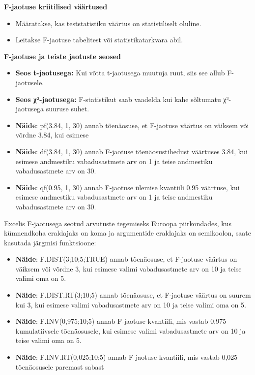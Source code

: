 \documentclass[
]{book}
\providecommand{\tightlist}{%
  \setlength{\itemsep}{0pt}\setlength{\parskip}{0pt}}
\begin{document}
\textbf{F-jaotuse kriitilised väärtused}

\begin{itemize}
\tightlist
\item
  Määratakse, kas teststatistiku väärtus on statistiliselt oluline.
\item
  Leitakse F-jaotuse tabelitest või statistikatarkvara abil.
\end{itemize}

\textbf{F-jaotuse ja teiste jaotuste seosed}

\begin{itemize}
\item
  \textbf{Seos t-jaotusega:} Kui võtta t-jaotusega muutuja ruut, siis see allub F-jaotusele.
\item
  \textbf{Seos χ²-jaotusega:} F-statistikut saab vaadelda kui kahe sõltumatu χ²-jaotusega suuruse suhet.
\item
  \textbf{Näide}: pf(3.84, 1, 30) annab tõenäosuse, et F-jaotuse väärtus on väiksem või võrdne 3.84, kui esimese
\item
  \textbf{Näide}: df(3.84, 1, 30) annab F-jaotuse tõenäosustihedust väärtuses 3.84, kui esimese andmestiku vabadusastmete arv on 1 ja teise andmestiku vabadusastmete arv on 30.
\item
  \textbf{Näide}: qf(0.95, 1, 30) annab F-jaotuse ülemise kvantiili 0.95 väärtuse, kui esimese andmestiku vabadusastmete arv on 1 ja teise andmestiku vabadusastmete arv on 30.
\end{itemize}

Excelis F-jaotusega seotud arvutuste tegemiseks Euroopa piirkondades, kus kümnendkoha eraldajaks on koma ja argumentide eraldajaks on semikoolon, saate kasutada järgmisi funktsioone:

\begin{itemize}
\tightlist
\item
  \textbf{Näide}: F.DIST(3;10;5;TRUE) annab tõenäosuse, et F-jaotuse väärtus on väiksem või võrdne 3, kui esimese valimi vabadusastmete arv on 10 ja teise valimi oma on 5.
\item
  \textbf{Näide}: F.DIST.RT(3;10;5) annab tõenäosuse, et F-jaotuse väärtus on suurem kui 3, kui esimese valimi vabadusastmete arv on 10 ja teise valimi oma on 5.
\item
  \textbf{Näide}: F.INV(0,975;10;5) annab F-jaotuse kvantiili, mis vastab 0,975 kumulatiivsele tõenäosusele, kui esimese valimi vabadusastmete arv on 10 ja teise valimi oma on 5.
\item
  \textbf{Näide}: F.INV.RT(0,025;10;5) annab F-jaotuse kvantiili, mis vastab 0,025 tõenäosusele paremast sabast
\end{itemize}
\end{document}
